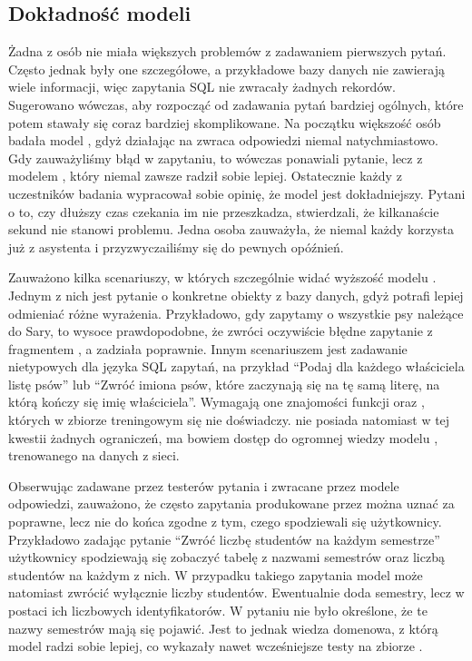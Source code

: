 \subsection{Dokładność modeli}
Żadna z osób nie miała większych problemów z zadawaniem pierwszych pytań. Często jednak były one szczegółowe, a przykładowe bazy danych nie zawierają wiele informacji, więc zapytania SQL nie zwracały żadnych rekordów. Sugerowano wówczas, aby rozpocząć od zadawania pytań bardziej ogólnych, które potem stawały się coraz bardziej skomplikowane. Na początku większość osób badała model , gdyż działając na  zwraca odpowiedzi niemal natychmiastowo. Gdy zauważyliśmy błąd w zapytaniu, to wówczas ponawiali pytanie, lecz z modelem , który niemal zawsze radził sobie lepiej. Ostatecznie każdy z uczestników badania wypracował sobie opinię, że model  jest dokładniejszy. Pytani o to, czy dłuższy czas czekania im nie przeszkadza, stwierdzali, że kilkanaście sekund nie stanowi problemu. Jedna osoba zauważyła, że niemal każdy korzysta już z asystenta   i przyzwyczailiśmy się do pewnych opóźnień.

Zauważono kilka scenariuszy, w których szczególnie widać wyższość modelu . Jednym z nich jest pytanie o konkretne obiekty z bazy danych, gdyż  potrafi lepiej odmieniać różne wyrażenia. Przykładowo, gdy zapytamy o wszystkie psy należące do Sary, to wysoce prawdopodobne, że  zwróci oczywiście błędne zapytanie z fragmentem , a  zadziała poprawnie. Innym scenariuszem jest zadawanie nietypowych dla języka SQL zapytań, na przykład \enquote{Podaj dla każdego właściciela listę psów} lub \enquote{Zwróć imiona psów, które zaczynają się na tę samą literę, na którą kończy się imię właściciela}. Wymagają one znajomości funkcji \mbox{} oraz , których w zbiorze treningowym  się nie doświadczy.  nie posiada natomiast w tej kwestii żadnych ograniczeń, ma bowiem dostęp do ogromnej wiedzy modelu , trenowanego na danych z sieci.

Obserwując zadawane przez testerów pytania i zwracane przez modele odpowiedzi, zauważono, że często zapytania produkowane przez  można uznać za poprawne, lecz nie do końca zgodne z tym, czego spodziewali się użytkownicy. Przykładowo zadając pytanie \enquote{Zwróć liczbę studentów na każdym semestrze} użytkownicy spodziewają się zobaczyć tabelę z nazwami semestrów oraz liczbą studentów na każdym z nich. W przypadku takiego zapytania model może natomiast zwrócić wyłącznie liczby studentów. Ewentualnie doda semestry, lecz w postaci ich liczbowych identyfikatorów. W pytaniu nie było określone, że te nazwy semestrów mają się pojawić. Jest to jednak wiedza domenowa, z którą model  radzi sobie lepiej, co wykazały nawet wcześniejsze testy na zbiorze .

